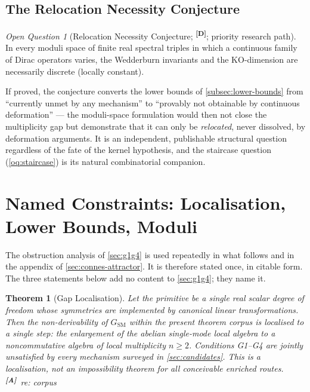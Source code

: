 \documentclass[12pt,a4paper,twoside]{article}
\theoremstyle{plain}
\newtheorem{theorem}{Theorem}[section]
\theoremstyle{definition}
\theoremstyle{remark}
\newtheorem{openquestion}{Open Question}
\newcommand{\catmark}[1]{\textsuperscript{\textsf{\textbf{[#1]}}}}
\begin{document}
\subsection{The Relocation Necessity Conjecture}
\label{subsec:rnc}

\begin{openquestion}[Relocation Necessity Conjecture; \catmark{D};
priority research path]
\label{oq:rnc}
In every moduli space of finite real spectral triples in which a
continuous family of Dirac operators varies, the Wedderburn invariants
and the KO-dimension are necessarily discrete (locally constant).
\end{openquestion}

If proved, the conjecture converts the lower bounds of
\cref{subsec:lower-bounds} from ``currently unmet by any mechanism'' to
``provably not obtainable by continuous deformation'' --- the moduli-space
formulation would then not close the multiplicity gap but demonstrate
that it can only be \emph{relocated}, never dissolved, by deformation
arguments. It is an independent, publishable structural question
regardless of the fate of the kernel hypothesis, and the staircase
question (\cref{oq:staircase}) is its natural combinatorial companion.


\section{Named Constraints: Localisation, Lower Bounds, Moduli}
\label{sec:named-constraints}

\noindent The obstruction analysis of \cref{sec:g1g4} is used repeatedly
in what follows and in the appendix of \cref{sec:connes-attractor}. It is
therefore stated once, in citable form. The three statements below add no
content to \cref{sec:g1g4}; they name it.

\begin{theorem}[Gap Localisation]
\label{thm:gap-localisation}
Let the primitive be a single real scalar degree of freedom whose
symmetries are implemented by canonical linear transformations. Then the
non-derivability of $G_{\mathrm{SM}}$ within the present theorem corpus
is localised to a single step: the enlargement of the abelian
single-mode local algebra to a noncommutative algebra of local
multiplicity $n \geq 2$. Conditions G1--G4 are jointly unsatisfied by
every mechanism surveyed in \cref{sec:candidates}. This is a
localisation, not an impossibility theorem for all conceivable enriched
routes.\catmark{A}\ \emph{re: corpus}
\end{theorem}
\end{document}
